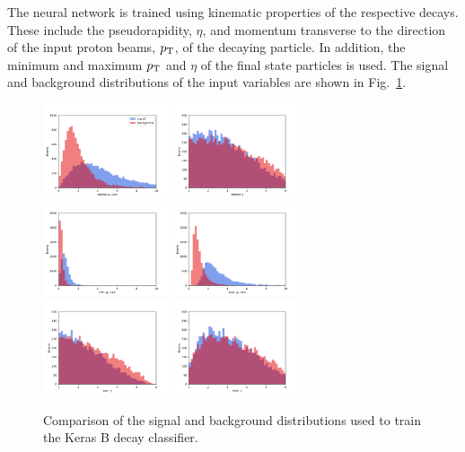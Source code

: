 \documentclass[final,5p,times,twocolumn]{elsarticle}
\def\pt         {\mbox{$p_{\rm T}$}\xspace}
\begin{document}
The neural network is trained using kinematic properties of the respective decays.
These include the pseudorapidity, $\eta$, and momentum transverse to the direction of the
input proton beams, \pt, of the decaying particle. In addition, the minimum and maximum \pt and $\eta$
of the final state particles is used. The signal and background distributions of the input variables
are shown in Fig.~\ref{fig:inputs}.
%
\begin{figure}[t]
\centering
\includegraphics[width=0.33\textwidth]{pt_comp.pdf}
\includegraphics[width=0.33\textwidth]{eta_comp.pdf}
\includegraphics[width=0.33\textwidth]{minpt_comp.pdf}
\includegraphics[width=0.33\textwidth]{maxpt_comp.pdf}
\includegraphics[width=0.33\textwidth]{mineta_comp.pdf}
\includegraphics[width=0.33\textwidth]{maxeta_comp.pdf}
\caption{\small Comparison of the signal and background distributions
used to train the Keras B decay classifier.}
\label{fig:inputs}
\end{figure}
\end{document}
